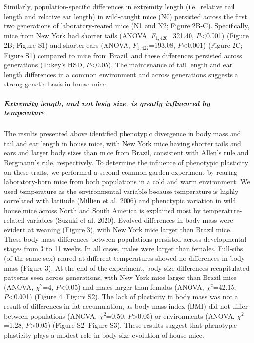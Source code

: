\documentclass[]{article}
\let\oldsubparagraph\subparagraph
\renewcommand{\subparagraph}[1]{\oldsubparagraph{#1}\mbox{}}
\begin{document}
Similarly, population-specific differences in extremity length
(i.e.~relative tail length and relative ear length) in wild-caught mice
(N0) persisted across the first two generations of laboratory-reared
mice (N1 and N2; Figure 2B-C). Specifically, mice from New York had
shorter tails (ANOVA, \emph{F}\(_{1,420}\)=321.40,
\emph{P}\textless{}0.001) (Figure 2B; Figure S1) and shorter ears
(ANOVA, \emph{F}\(_{1,422}\)=193.08, \emph{P}\textless{}0.001) (Figure
2C; Figure S1) compared to mice from Brazil, and these differences
persisted across generations (Tukey's HSD, \emph{P}\textless{}0.05). The
maintenance of tail length and ear length differences in a common
environment and across generations suggests a strong genetic basis in
house mice.

\vspace{2.5mm}

\hypertarget{extremity-length-and-not-body-size-is-greatly-influenced-by-temperature}{%
\subparagraph{\texorpdfstring{\emph{Extremity length, and not body size,
is greatly influenced by
temperature}}{Extremity length, and not body size, is greatly influenced by temperature}}\label{extremity-length-and-not-body-size-is-greatly-influenced-by-temperature}}

The results presented above identified phenotypic divergence in body
mass and tail and ear length in house mice, with New York mice having
shorter tails and ears and larger body sizes than mice from Brazil,
consistent with Allen's rule and Bergmann's rule, respectively. To
determine the influence of phenotypic plasticity on these traits, we
performed a second common garden experiment by rearing laboratory-born
mice from both populations in a cold and warm environment. We used
temperature as the environmental variable because temperature is highly
correlated with latitude (Millien et al. 2006) and phenotypic variation
in wild house mice across North and South America is explained most by
temperature-related variables (Suzuki et al. 2020). Evolved differences
in body mass were evident at weaning (Figure 3), with New York mice
larger than Brazil mice. These body mass differences between populations
persisted across developmental stages from 3 to 11 weeks. In all cases,
males were larger than females. Full-sibs (of the same sex) reared at
different temperatures showed no differences in body mass (Figure 3). At
the end of the experiment, body size differences recapitulated patterns
seen across generations, with New York mice larger than Brazil mice
(ANOVA, \(\chi^2\)=4, \emph{P}\textless{}0.05) and males larger than
females (ANOVA, \(\chi^2\)=42.15, \emph{P}\textless{}0.001) (Figure 4,
Figure S2). The lack of plasticity in body mass was not a result of
differences in fat accumulation, as body mass index (BMI) did not differ
between populations (ANOVA, \(\chi^2\)=0.50, \emph{P}\textgreater{}0.05)
or environments (ANOVA, \(\chi^2\)=1.28, \emph{P}\textgreater{}0.05)
(Figure S2; Figure S3). These results suggest that phenotypic plasticity
plays a modest role in body size evolution of house mice.
\end{document}
